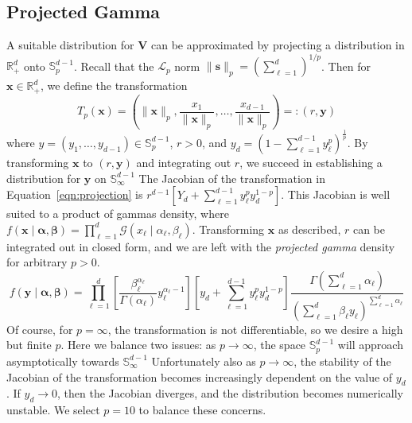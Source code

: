 \subsection{Projected Gamma}
A suitable distribution for $\bm{V}$ can be approximated by projecting a 
    distribution in $\mathbb{R}_+^d$ onto $\mathbb{S}_{p}^{d-1}$.  
    Recall that the $\mathcal{L}_p$ norm 
    $\lVert \bm{s}\rVert_p = \left(\sum_{\ell = 1}^d\right)^{1/p}$.  Then
    for $\bm{x}\in\mathbb{R}_+^d$, we define the transformation
    \begin{equation}
    \label{eqn:projection}
        T_p(\bm{x}) = \left(\lVert \bm{x}\rVert_p, 
            \frac{x_1}{\lVert \bm{x}\rVert_p},\ldots, 
                \frac{x_{d-1}}{\lVert \bm{x}\rVert_p}\right)
                =: (r,\bm{y})
    \end{equation}
    where $y = (y_1,\ldots,y_{d-1}) \in \mathbb{S}_{p}^{d-1}$, $r > 0$, and 
    $y_d = \left(1 - \sum_{\ell = 1}^{d-1}y_{\ell}^p\right)^{\frac{1}{p}}$.
    By transforming $\bm{x}$ to $(r,\bm{y})$ and integrating out $r$, we
    succeed in establishing a distribution for $\bm{y}$ on 
    $\mathbb{S}_{\infty}^{d-1}$
    The Jacobian of the transformation in Equation~\eqref{eqn:projection} is
    $r^{d-1}\left[Y_d + \sum_{\ell = 1}^{d-1}y_{\ell}^py_d^{1-p}\right]$.
    This Jacobian is well suited to a product of gammas density, where 
    $f(\bm{x}\mid\bm{\alpha},\bm{\beta}) = 
        \prod_{\ell = 1}^d\mathcal{G}(x_{\ell}\mid\alpha_{\ell},\beta_{\ell})$.
    Transforming $\bm{x}$ as described, $r$ can be integrated out in closed
    form, and we are left with the \emph{projected gamma} density for arbitrary 
    $p > 0$.
    \[
        f(\bm{y}\mid\bm{\alpha},\bm{\beta}) = \prod_{\ell = 1}^d\left[
            \frac{\beta_{\ell}^{\alpha_{\ell}}}{\Gamma(\alpha_{\ell})}
            y_{\ell}^{\alpha_{\ell} - 1}\right]
            \left[y_d + \sum_{\ell = 1}^{d-1}y_{\ell}^py_d^{1-p}\right]
            \frac{\Gamma(\sum_{\ell = 1}^d \alpha_{\ell})}{\left(
                \sum_{\ell = 1}^d\beta_{\ell}y_{\ell}
                \right)^{\sum_{\ell = 1}^d \alpha_{\ell}}
            }
    \]
    Of course, for $p=\infty$, the transformation is not differentiable, so we
    desire a high but finite $p$.
    Here we balance two issues: as $p\to\infty$, the space $\mathbb{S}_{p}^{d-1}$ 
    will approach asymptotically towards $\mathbb{S}_{\infty}^{d-1}$
    Unfortunately also as $p\to\infty$, the stability of the Jacobian of the
    transformation becomes increasingly dependent on the value of $y_d$.  If 
    $y_d\to 0$, then the Jacobian diverges, and the distribution becomes 
    numerically unstable. We select $p=10$ to balance these concerns.





